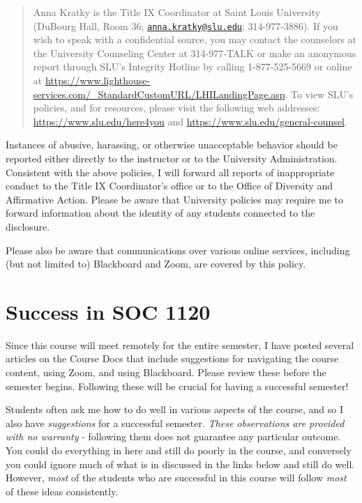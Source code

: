 \documentclass[
]{book}
\begin{document}
\begin{quote}
Anna Kratky is the Title IX Coordinator at Saint Louis University (DuBourg Hall, Room 36; \href{mailto:anna.kratky@slu.edu}{\nolinkurl{anna.kratky@slu.edu}}; 314-977-3886). If you wish to speak with a confidential source, you may contact the counselors at the University Counseling Center at 314-977-TALK or make an anonymous report through SLU's Integrity Hotline by calling 1-877-525-5669 or online at \url{https://www.lighthouse-services.com/_StandardCustomURL/LHILandingPage.asp}. To view SLU's policies, and for resources, please visit the following web addresses: \url{https://www.slu.edu/here4you} and \url{https://www.slu.edu/general-counsel}.
\end{quote}

Instances of abusive, harassing, or otherwise unacceptable behavior should be reported either directly to the instructor or to the University Administration. Consistent with the above policies, I will forward all reports of inappropriate conduct to the Title IX Coordinator's office or to the Office of Diversity and Affirmative Action. Please be aware that University policies may require me to forward information about the identity of any students connected to the disclosure.

Please also be aware that communications over various online services, including (but not limited to) Blackboard and Zoom, are covered by this policy.

\hypertarget{success-in-soc-1120}{%
\chapter{Success in SOC 1120}\label{success-in-soc-1120}}

Since this course will meet remotely for the entire semester, I have posted several articles on the Course Docs that include suggestions for navigating the course content, using Zoom, and using Blackboard. Please review these before the semester begins. Following these will be crucial for having a successful semester!

Students often ask me how to do well in various aspects of the course, and so I also have \emph{suggestions} for a successful semester. \emph{These observations are provided with no warranty} - following them does not guarantee any particular outcome. You could do everything in here and still do poorly in the course, and conversely you could ignore much of what is in discussed in the links below and still do well. However, \emph{most} of the students who are successful in this course will follow \emph{most} of these ideas consistently.
\end{document}
